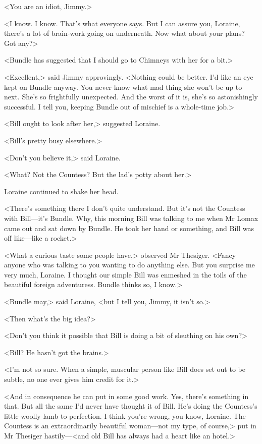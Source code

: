 <You are an idiot, Jimmy.>

<I know. I know. That's what everyone says. But I can assure you, Loraine, there's a lot of brain-work going on underneath. Now what about your plans? Got any?>

<Bundle has suggested that I should go to Chimneys with her for a bit.>

<Excellent,> said Jimmy approvingly. <Nothing could be better. I'd like an eye kept on Bundle anyway. You never know what mad thing she won't be up to next. She's so frightfully unexpected. And the worst of it is, she's so astonishingly successful. I tell you, keeping Bundle out of mischief is a whole-time job.>

<Bill ought to look after her,> suggested Loraine.

<Bill's pretty busy elsewhere.>

<Don't you believe it,> said Loraine.

<What? Not the Countess? But the lad's potty about her.>

Loraine continued to shake her head.

<There's something there I don't quite understand. But it's not the Countess with Bill—it's Bundle. Why, this morning Bill was talking to me when Mr Lomax came out and sat down by Bundle. He took her hand or something, and Bill was off like—like a rocket.>

<What a curious taste some people have,> observed Mr Thesiger. <Fancy anyone who was talking to you wanting to do anything else. But you surprise me very much, Loraine. I thought our simple Bill was enmeshed in the toils of the beautiful foreign adventuress. Bundle thinks so, I know.>

<Bundle may,> said Loraine, <but I tell you, Jimmy, it isn't so.>

<Then what's the big idea?>

<Don't you think it possible that Bill is doing a bit of sleuthing on his own?>

<Bill? He hasn't got the brains.>

<I'm not so sure. When a simple, muscular person like Bill does set out to be subtle, no one ever gives him credit for it.>

<And in consequence he can put in some good work. Yes, there's something in that. But all the same I'd never have thought it of Bill. He's doing the Countess's little woolly lamb to perfection. I think you're wrong, you know, Loraine. The Countess is an extraordinarily beautiful woman—not my type, of course,> put in Mr Thesiger hastily—<and old Bill has always had a heart like an hotel.>

